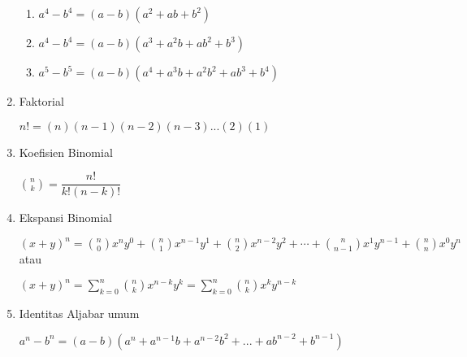\begin{enumerate}
\begin{enumerate}
					\item $a^4-b^4=(a-b)(a^2+ab+b^2)$ 
					\item $a^4-b^4=(a-b)(a^3+a^2b+ab^2+b^3)$
					\item $a^5-b^5=(a-b)(a^4+a^3b+a^2b^2+ab^3+b^4)$
				\end{enumerate}
			\item Faktorial
			\begin{center}
				$n!=(n)(n-1)(n-2)(n-3)...(2)(1)$
			\end{center}
			\item Koefisien Binomial
				\begin{center}
					$\binom {n}{k}=\dfrac {n!}{k!(n-k)!}$
				\end{center}
			\item Ekspansi Binomial
			\begin{center}
				$(x+y)^{n}={n \choose 0}x^{n}y^{0}+{n \choose 1}x^{n-1}y^{1}+{n \choose 2}x^{n-2}y^{2}+\cdots +{n \choose n-1}x^{1}y^{n-1}+{n \choose n}x^{0}y^{n}$\\
				
				atau
				
				$(x+y)^{n}=\sum _{k=0}^{n}{n \choose k}x^{n-k}y^{k}=\sum _{k=0}^{n}{n \choose k}x^{k}y^{n-k}$
			\end{center}
			
			\item Identitas Aljabar umum
			\begin{center}
				$a^n-b^n=(a-b)(a^n+a^{n-1}b+a^{n-2}b^{2}+...+ab^{n-2}+b^{n-1})$
			\end{center}
			
			\begin{center}
				

\end{center}
\end{enumerate}
